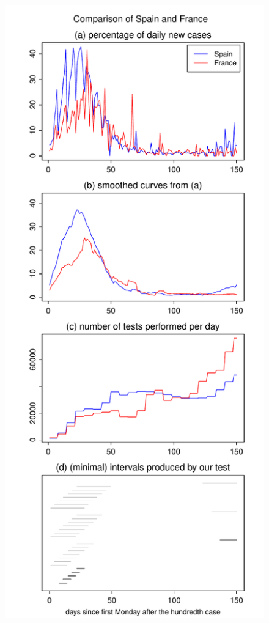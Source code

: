 \documentclass[a4paper,12pt]{article}
\numberwithin{equation}{section}
\begin{document}
\begin{figure}[p!]
\begin{minipage}[t]{0.49\textwidth}
\includegraphics[width=\textwidth]{plots/ESP_vs_FRA_normalised}

\end{minipage}
\end{figure}
\end{document}
